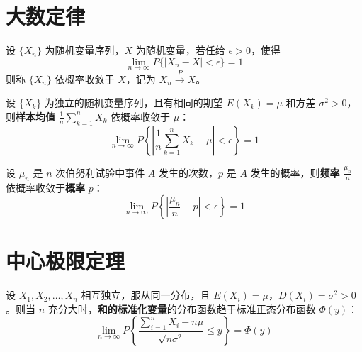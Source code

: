\section{大数定律}
\begin{definition}[依概率收敛]
设 $\{X_n\}$ 为随机变量序列，$X$ 为随机变量，若任给 $\epsilon > 0$，使得
\begin{equation}
	\lim_{n \to \infty} P\{|X_n - X| < \epsilon\} = 1
	\label{eq:第五章:依概率收敛}
\end{equation}
则称 $\{X_n\}$ 依概率收敛于 $X$，记为 $X_n \xrightarrow{P} X$。
\end{definition}

\begin{theorem}[切比雪夫大数定律]
设 $\{X_k\}$ 为独立的随机变量序列，且有相同的期望 $E(X_k) = \mu$ 和方差 $\sigma^2 > 0$，则\textbf{样本均值} $\frac{1}{n}\sum_{k=1}^{n} X_k$ 依概率收敛于 $\mu$：
\begin{equation}
	\lim_{n \to \infty} P\left\{\left|\frac{1}{n}\sum_{k=1}^{n} X_k - \mu\right| < \epsilon\right\} = 1
	\label{eq:第五章:切比雪夫大数定律}
\end{equation}
\end{theorem}

\begin{theorem}[伯努利大数定律]
设 $\mu_n$ 是 $n$ 次伯努利试验中事件 $A$ 发生的次数，$p$ 是 $A$ 发生的概率，则\textbf{频率} $\frac{\mu_n}{n}$ 依概率收敛于\textbf{概率} $p$：
\begin{equation}
	\lim_{n \to \infty} P\left\{\left|\frac{\mu_n}{n} - p\right| < \epsilon\right\} = 1
	\label{eq:第五章:伯努利大数定律}
\end{equation}
\end{theorem}

\section{中心极限定理}
\begin{theorem}
设 $X_1, X_2, \ldots, X_n$ 相互独立，服从同一分布，且 $E(X_i) = \mu$，$D(X_i) = \sigma^2 > 0$。则当 $n$ 充分大时，\textbf{和的标准化变量}的分布函数趋于标准正态分布函数 $\Phi(y)$：
\begin{equation}
	\lim_{n \to \infty} P\left\{\frac{\sum_{i=1}^{n} X_i - n\mu}{\sqrt{n\sigma^{2}}} \le y\right\} = \Phi(y)
	\label{eq:第五章:林德伯格}
\end{equation}
\end{theorem}

